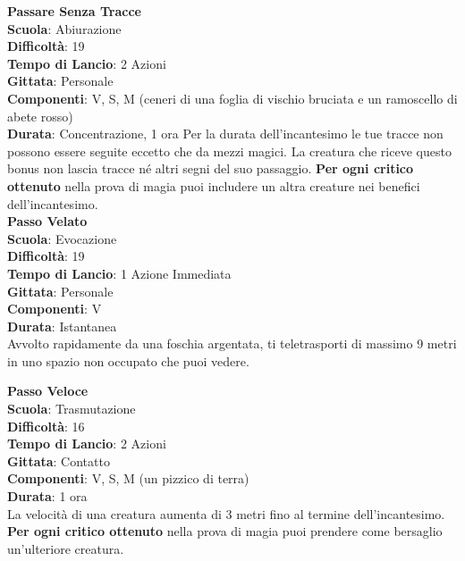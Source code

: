 \begin{multicols}{2}
\medskip\textbf{Passare Senza Tracce}\\
\textbf{Scuola}: Abiurazione\\
\textbf{Difficoltà}: 19\\
\textbf{Tempo di Lancio}: 2 Azioni\\
\textbf{Gittata}: Personale\\
\textbf{Componenti}: V, S, M (ceneri di una foglia di vischio bruciata e un ramoscello di abete rosso)\\
\textbf{Durata}: Concentrazione, 1 ora
Per la durata dell'incantesimo le tue tracce non possono essere seguite eccetto che da mezzi magici. La creatura che riceve questo bonus non lascia tracce né altri segni del suo passaggio.
\textbf{Per ogni critico ottenuto} nella prova di magia puoi includere un altra creature nei benefici dell'incantesimo.\\


\medskip\textbf{Passo Velato}\\
\textbf{Scuola}: Evocazione\\
\textbf{Difficoltà}: 19\\
\textbf{Tempo di Lancio}: 1 Azione Immediata\\
\textbf{Gittata}: Personale\\
\textbf{Componenti}: V\\
\textbf{Durata}: Istantanea\\
Avvolto rapidamente da una foschia argentata, ti teletrasporti di massimo 9 metri in uno spazio non occupato che puoi vedere.

\medskip\textbf{Passo Veloce}\\
\textbf{Scuola}: Trasmutazione\\
\textbf{Difficoltà}: 16\\
\textbf{Tempo di Lancio}: 2 Azioni\\
\textbf{Gittata}: Contatto\\
\textbf{Componenti}: V, S, M (un pizzico di terra)\\
\textbf{Durata}: 1 ora\\
La velocità di una creatura aumenta di 3 metri fino al termine dell'incantesimo. \\
\textbf{Per ogni critico ottenuto} nella prova di magia puoi prendere come bersaglio un'ulteriore creatura.


\end{multicols}

